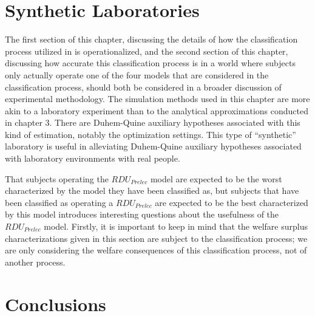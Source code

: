 \documentclass[../main.tex]{subfiles}
\begin{document}
\section{Synthetic Laboratories}

The first section of this chapter, discussing the details of how the classification process utilized in \textcite{Harrison2016} is operationalized, and the second section of this chapter, discussing how accurate this classification process is in a world where subjects only actually operate one of the four models that are considered in the classification process, should both be considered in a broader discussion of experimental methodology.
The simulation methods used in this chapter are more akin to a laboratory experiment than to the analytical approximations conducted in chapter 3.
There are Duhem-Quine auxiliary hypotheses associated with this kind of estimation, notably the optimization settings.
This type of \enquote{synthetic} laboratory is useful in alleviating Duhem-Quine auxiliary hypotheses associated with laboratory environments with real people.





That subjects operating the $\mathit{RDU_{Prelec}}$ model are expected to be the worst characterized by the model they have been classified as, but subjects that have been classified as operating a $\mathit{RDU_{Prelec}}$ are expected to be the best characterized by this model introduces interesting questions about the usefulness of the $\mathit{RDU_{Prelec}}$ model.
Firstly, it is important to keep in mind that the welfare surplus characterizations given in this section are subject to the classification process; we are only considering the welfare consequences of this classification process, not of another process.

\section{Conclusions}

\onlyinsubfile{
\newpage
\printbibliography[segment=4, heading=subbibliography]
}
\end{document}
